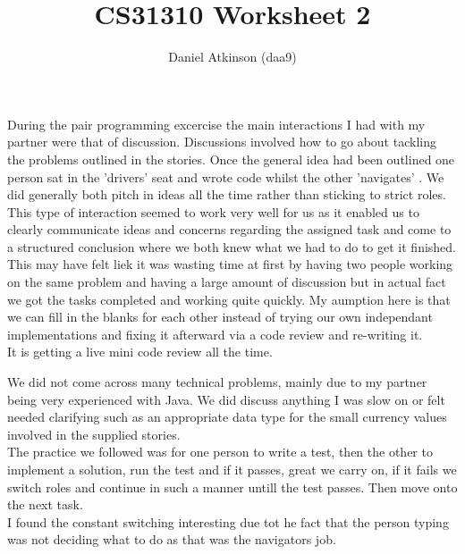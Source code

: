 \documentclass[11pt]{article}
\begin{document}
\title{CS31310 Worksheet 2}

\author{Daniel Atkinson (daa9)}
\date{}
\maketitle
During the pair programming excercise the main interactions I had with my partner were that of discussion.  Discussions involved how to go about tackling the problems outlined in the stories.  Once the general idea had been outlined one person sat in the 'drivers' seat and wrote code whilst the other 'navigates' .  We did generally both pitch in ideas all the time rather than sticking to strict roles.
\\This type of interaction seemed to work very well for us as it enabled us to clearly communicate ideas and concerns regarding the assigned task and come to a structured conclusion where we both knew what we had to do to get it finished.  This may have felt liek it was wasting time at first by having two people working on the same problem and having a large amount of discussion but in actual fact we got the tasks completed and working quite quickly.  My aumption here is that we can fill in the blanks for each other instead of trying our own independant implementations and fixing it afterward via a code review and re-writing it.
\\It is getting a live mini code review all the time.
\newline

We did not come across many technical problems, mainly due to my partner being very experienced with Java.  We did discuss anything I was slow on or felt needed clarifying such as an appropriate data type for the small currency values involved in the supplied stories.
\\The practice we followed was for one person to write a test, then the other to implement a solution, run the test and if it passes, great we carry on, if it fails we switch roles and continue in such a manner untill the test passes.  Then move onto the next task.
\\I found the constant switching interesting due tot he fact that the person typing was not deciding what to do as that was the navigators job.
\newline
\end{document}
